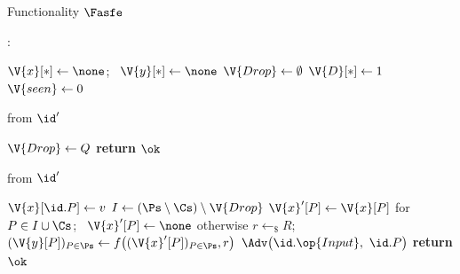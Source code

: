 \begin{interface}[nofloat]{Functionality $\Fasfe$ \\
}

{\scriptsize
\setlength{\columnsep}{1.4em}
\begin{multicols}{2}
:
\begin{algorithmic}[1]
\setcounter{contline}{0}\algcont
\State $\V{x}[*] \gets \none$; \ $\V{y}[*] \gets \none$
\State $\V{Drop} \gets \emptyset$
\State $\V{D}[*] \gets 1$
\State $\V{seen} \gets 0$
\algsave
\end{algorithmic}
\vspace{1.4ex}

 \quad from $\id'$
\begin{algorithmic}[1]
\algcont
{} \label{ln:asfedropbound}
\State $\V{Drop} \gets Q$ \label{ln:asfedrop}
\State \textbf{return} $\ok$
\algsave
\end{algorithmic}
\vspace{1.4ex}

 \quad from $\id'$
\begin{algorithmic}[1]
\algcont
{} \label{ln:asfelate}
\State $\V{x}[\id.P] \gets v$
\State $I \gets (\Ps \setminus \Cs) \setminus \V{Drop}$ \label{ln:asfecore}
  \State $\V{x}'[P] \gets \V{x}[P]$ for $P \in I \cup \Cs$; \ $\V{x}'[P] \gets \none$ otherwise \label{ln:asfevector}
  \State $r \gets_{\$} R$; \ $(\V{y}[P])_{P \in \Ps} \gets f\bigl((\V{x}'[P])_{P \in \Ps}, r\bigr)$ \label{ln:asfeeval}
\EndIf
\State $\Adv\bigl(\id.\op{Input},\ \id.P\bigr)$ \label{ln:asfeleak}
\State \textbf{return} $\ok$
\algsave
\end{algorithmic}
\vspace{1.4ex}


\end{multicols}}
\end{interface}
